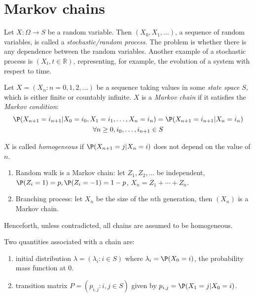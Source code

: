 \documentclass[a4paper]{article}
\begin{document}
\maketitle

\tableofcontents

\section{Markov chains}

Let $X:\Omega \to S$ be a random variable. Then $(X_0,X_1, \ldots)$, a sequence of random variables, is called a \emph{stochastic/random process}. The problem is whether there is any dependence between the random variables. Another example of a stochastic process is $(X_t, t \in \mathbb{R})$, representing, for example, the evolution of a system with respect to time.


\begin{defi}
  Let $X=(X_n:n=0,1,2,\ldots)$ be a sequence taking values in some \emph{state space} $S$, which is either finite or countably infinite. $X$ is a \emph{Markov chain} if it satisfies the \emph{Markov condition}:
  \begin{multline*}
    \P(X_{n+1}=i_{n+1}|X_0=i_0,X_1=i_1,\ldots,X_n=i_n) = \P(X_{n+1}=i_{n+1}|X_n=i_n) \\
    \forall n\geq0, i_0,\ldots,i_{n+1}\in S
  \end{multline*}

  $X$ is called \emph{homogeneous} if $\P(X_{n+1}=j|X_n=i)$ does not depend on the value of $n$.
\end{defi}

\begin{ex}\leavevmode
  \begin{enumerate}
  \item Random walk is a Markov chain: let $Z_1, Z_2, \ldots$ be independent, $\P(Z_i=1) = p,\P(Z_i=-1) =1-p$, $X_n=Z_1+\cdots+Z_n$.
  \item Branching process: let $X_n$ be the size of the $n$th generation, then $(X_n)$ is a Markov chain.
  \end{enumerate}
\end{ex}

\begin{convention}
  Henceforth, unless contradicted, all chains are assumed to be homogeneous.
\end{convention}

Two quantities associated with a chain are:
\begin{enumerate}
\item initial distribution $\lambda = (\lambda_i: i\in S)$ where $\lambda_i = \P(X_0=i)$, the probability mass function at $0$.
\item transition matrix $P = (p_{i,j}: i,j\in S)$ given by $p_{i,j} = \P(X_1=j|X_0=i)$.
\end{enumerate}
\end{document}
